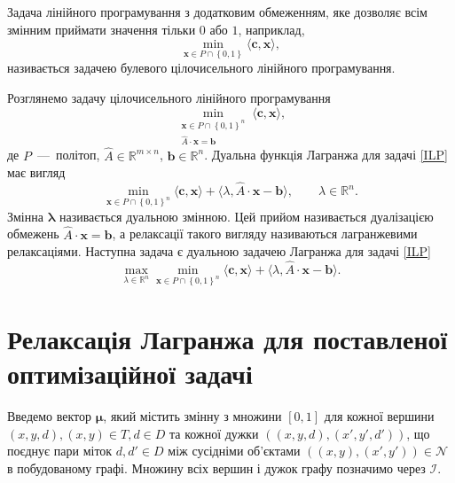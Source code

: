 Задача лінійного програмування з додатковим обмеженням,
яке дозволяє всім змінним приймати значення тільки $0$ або $1$,
наприклад,
\begin{equation*}
    \min \limits_{\pmb{x} \in P \cap \left\{ 0, 1 \right\}}
    \langle \pmb{c}, \pmb{x} \rangle,
\end{equation*}
називається задачею булевого цілочисельного лінійного програмування.

Розглянемо задачу цілочисельного лінійного програмування
\begin{equation} \label{ILP}
    \min \limits_{\substack{\pmb{x} \in P \cap \left\{ 0, 1\right\}^n \\
                  \hat{A} \cdot \pmb{x} = \pmb{b}}}
        \langle \pmb{c}, \pmb{x} \rangle,
\end{equation}
де $P$~---~політоп, $\hat{A} \in \mathbb{R}^{m \times n}$,
$\pmb{b} \in \mathbb{R}^n$.
Дуальна функція Лагранжа для задачі \eqref{ILP} має вигляд
\begin{equation} \label{dualization}
    \min \limits_{\pmb{x} \in P \cap \left\{ 0, 1 \right\}^n}
        \langle \pmb{c}, \pmb{x} \rangle +
    \langle \lambda, \hat{A} \cdot \pmb{x} - \pmb{b} \rangle, \qquad
    \lambda \in \mathbb{R}^n.
\end{equation}
Змінна $\pmb{\lambda}$ називається дуальною змінною.
Цей прийом називається дуалізацією обмежень $\hat{A} \cdot \pmb{x} = \pmb{b}$,
а релаксації такого вигляду називаються лагранжевими релаксаціями.
Наступна задача є дуальною задачею Лагранжа для задачі \eqref{ILP}
\begin{equation} \label{lagrange:dual:problem}
    \max \limits_{\lambda \in \mathbb{R}^n}
        \min \limits_{\pmb{x} \in P \cap \left\{ 0, 1 \right\}^n}
            \langle \pmb{c}, \pmb{x} \rangle +
        \langle \lambda, \hat{A} \cdot \pmb{x} - \pmb{b} \rangle.
\end{equation}

\section{Релаксація Лагранжа для поставленої оптимізаційної задачі}

Введемо вектор $\pmb{\mu}$, який містить змінну з множини $ \left[ 0, 1 \right]$
для кожної вершини
$\left( x, y, d \right), \left(x, y \right) \in T, d \in D$ та кожної дужки
$\left( \left( x, y, d \right), \left(x', y', d' \right) \right)$,
що поєднує пари міток $d, d' \in D$ між сусідніми об'єктами
$\left(\left(x, y \right), \left(x', y' \right) \right) \in \mathcal{N}$
в побудованому графі.
Множину всіх вершин і дужок графу позначимо через $\mathcal{I}$.

